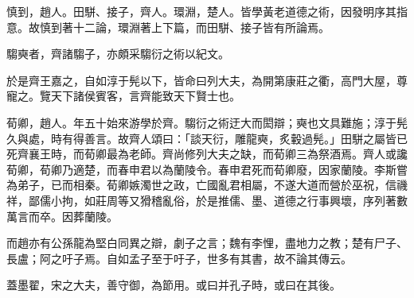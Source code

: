 \begin{pinyinscope}
慎到，趙人。田駢、接子，齊人。環淵，楚人。皆學黃老道德之術，因發明序其指意。故慎到著十二論，環淵著上下篇，而田駢、接子皆有所論焉。

騶奭者，齊諸騶子，亦頗采騶衍之術以紀文。

於是齊王嘉之，自如淳于髡以下，皆命曰列大夫，為開第康莊之衢，高門大屋，尊寵之。覽天下諸侯賓客，言齊能致天下賢士也。

荀卿，趙人。年五十始來游學於齊。騶衍之術迂大而閎辯；奭也文具難施；淳于髡久與處，時有得善言。故齊人頌曰：「談天衍，雕龍奭，炙轂過髡。」田駢之屬皆已死齊襄王時，而荀卿最為老師。齊尚修列大夫之缺，而荀卿三為祭酒焉。齊人或讒荀卿，荀卿乃適楚，而春申君以為蘭陵令。春申君死而荀卿廢，因家蘭陵。李斯嘗為弟子，已而相秦。荀卿嫉濁世之政，亡國亂君相屬，不遂大道而營於巫祝，信禨祥，鄙儒小拘，如莊周等又猾稽亂俗，於是推儒、墨、道德之行事興壞，序列著數萬言而卒。因葬蘭陵。

而趙亦有公孫龍為堅白同異之辯，劇子之言；魏有李悝，盡地力之教；楚有尸子、長盧；阿之吁子焉。自如孟子至于吁子，世多有其書，故不論其傳云。

蓋墨翟，宋之大夫，善守御，為節用。或曰并孔子時，或曰在其後。


\end{pinyinscope}